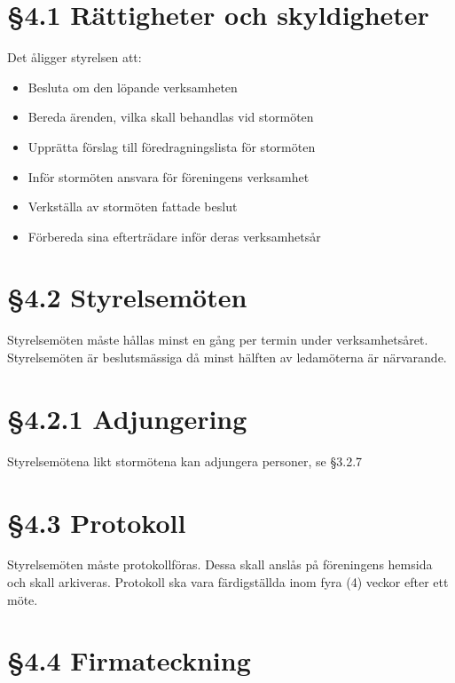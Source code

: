 \documentclass[]{article}
\providecommand{\tightlist}{%
  \setlength{\itemsep}{0pt}\setlength{\parskip}{0pt}}
\begin{document}
\section{§4.1 Rättigheter och
skyldigheter}\label{ruxe4ttigheter-och-skyldigheter}

Det åligger styrelsen att:

\begin{itemize}
\tightlist
\item
  Besluta om den löpande verksamheten
\item
  Bereda ärenden, vilka skall behandlas vid stormöten
\item
  Upprätta förslag till föredragningslista för stormöten
\item
  Inför stormöten ansvara för föreningens verksamhet
\item
  Verkställa av stormöten fattade beslut
\item
  Förbereda sina efterträdare inför deras verksamhetsår
\end{itemize}

\section{§4.2 Styrelsemöten}\label{styrelsemuxf6ten}

Styrelsemöten måste hållas minst en gång per termin under
verksamhetsåret. Styrelsemöten är beslutsmässiga då minst hälften av
ledamöterna är närvarande.

\section{§4.2.1 Adjungering}\label{adjungering-1}

Styrelsemötena likt stormötena kan adjungera personer, se §3.2.7

\section{§4.3 Protokoll}\label{protokoll-1}

Styrelsemöten måste protokollföras. Dessa skall anslås på föreningens
hemsida och skall arkiveras. Protokoll ska vara färdigställda inom fyra
(4) veckor efter ett möte.

\section{§4.4 Firmateckning}\label{firmateckning}
\end{document}
